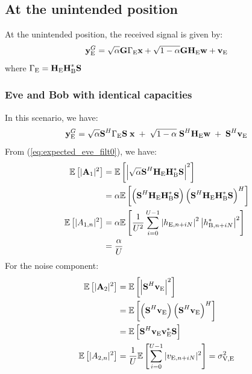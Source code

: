 


\subsection{At the unintended position}
At the unintended position, the received signal is given by:
\begin{equation}
    \textbf{y}_{\text{E}}^G = \sqrt{\alpha} \textbf{G}\Gamma_{\text{E}} \textbf{x} + \sqrt{1-\alpha} \textbf{G} \textbf{H}_{\text{E}} \textbf{w} + \textbf{v}_{\text{E}}
    \label{eq:appA_rx_eve}
\end{equation}
where $\Gamma_{\text{E}} = \textbf{H}_{\text{E}} \textbf{H}_{\text{B}}^*\textbf{S}$




\subsubsection{Eve and Bob with identical capacities}
In this scenario, we have:
\begin{equation}
    \textbf{y}_{\text{E}}^G = \sqrt{\alpha} \textbf{S}^H \Gamma_{\text{E}} \textbf{S}\; \textbf{x} \; +  \; \sqrt{1-\alpha} \; \textbf{S}^H \textbf{H}_{\text{E}} \textbf{w}  \; +  \; \textbf{S}^H  \textbf{v}_\text{E} 
    \label{eq:app:rx_eve_filt0}
\end{equation}
From (\ref{eq:expected_eve_filt0}), we have:
\begin{subequations}
    \begin{align}
        \mathbb{E} \left[|\textbf{A}_{1}|^2\right] &= \mathbb{E} \left[\left|\sqrt{\alpha}\textbf{S}^H \textbf{H}_{\text{E}}\textbf{H}_{\text{B}}^* \textbf{S}\right|^2\right] \\
        &= \alpha \mathbb{E} \left[\left( \textbf{S}^H \textbf{H}_{\text{E}}\textbf{H}_{\text{B}}^* \textbf{S} \right) \left( \textbf{S}^H \textbf{H}_{\text{E}}\textbf{H}_{\text{B}}^* \textbf{S}\right)^H\right] \\
        \mathbb{E} \left[|A_{1,n}|^2\right]&=\alpha \mathbb{E} \left[\frac{1}{U^2} \sum_{i=0}^{U-1} \left| h_{\text{E}, n + iN} \right|^2 \left| h^*_{\text{B}, n + iN}\right|^2 \right] \\
        &= \frac{\alpha}{U}
    \end{align}
    \label{eq:appA:data_eve_filt0}
\end{subequations}
For the noise component:
\begin{subequations}
    \begin{align}
        \mathbb{E} \left[|\textbf{A}_{2}|^2\right] &=  \mathbb{E} \left[\left|\textbf{S}^H \textbf{v}_{\text{E}}\right|^2\right] \\
        &= \mathbb{E} \left[\left(\textbf{S}^H \textbf{v}_{\text{E}} \right)\left(\textbf{S}^H \textbf{v}_{\text{E}} \right)^H\right] \\
        &=\mathbb{E} \left[\textbf{S}^H \textbf{v}_{\text{E}} \textbf{v}_{\text{E}}^* \textbf{S} \right] \\
        \mathbb{E} \left[|A_{2,n}|^2\right] &= \frac{1}{U} \mathbb{E} \left[\sum_{i=0}^{U-1} |v_{\text{E}, n + iN}|^2\right] = \sigma^2_{\text{V,E}}
    \end{align}
    \label{eq:appA:noise_eve_filt0}
\end{subequations}
